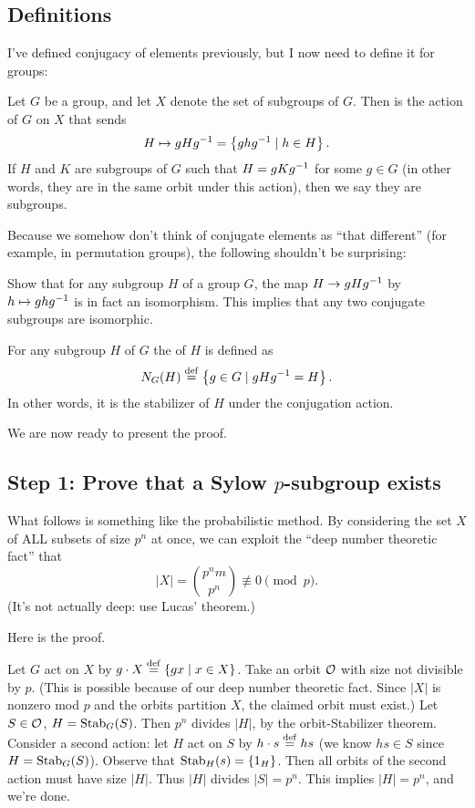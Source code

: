 \subsection*{Definitions}
I've defined conjugacy of elements previously,
but I now need to define it for groups:
\begin{definition}
	Let $G$ be a group, and let $X$ denote the set of subgroups of $G$.
	Then  is the action of $G$ on $X$ that sends
	\[ H \mapsto gHg^{-1} = \left\{ ghg^{-1} \mid h \in H \right\}. \]
	If $H$ and $K$ are subgroups of $G$ such that $H = gKg^{-1}$ for some $g \in G$
	(in other words, they are in the same orbit under this action),
	then we say they are  subgroups.
\end{definition}

Because we somehow don't think of conjugate elements as
``that different'' (for example, in permutation groups),
the following shouldn't be surprising:
\begin{ques}
	Show that for any subgroup $H$ of a group $G$, the map $H \to gHg^{-1}$ by
	$h \mapsto ghg^{-1}$ is in fact an isomorphism.
	This implies that any two conjugate subgroups are isomorphic.
\end{ques}

\begin{definition}
	For any subgroup $H$ of $G$ the  of $H$ is defined as
	\[ N_G(H) \overset{\mathrm{def}}{=} \left\{ g \in G \mid gHg^{-1} = H \right\}. \]
	In other words, it is the stabilizer of $H$ under the conjugation action.
\end{definition}

We are now ready to present the proof.

\subsection*{Step 1: Prove that a Sylow $p$-subgroup exists}
What follows is something like the probabilistic method.
By considering the set $X$ of ALL subsets of size $p^n$ at once, we can exploit the ``deep number theoretic fact'' that 
\[ \left\lvert X \right\rvert = \binom{p^n m}{p^n} \not\equiv 0 \pmod p. \]
(It's not actually deep: use Lucas' theorem.)

Here is the proof.
\begin{itemize}
	\ii Let $G$ act on $X$ by $g \cdot X \overset{\mathrm{def}}{=} \left\{ gx \mid x \in X \right\}$.
	\ii Take an orbit $\mathcal O$ with size not divisible by $p$.
	(This is possible because of our deep number theoretic fact.
	Since $\left\lvert X \right\rvert$ is nonzero mod $p$ and the orbits partition $X$,
	the claimed orbit must exist.)
	\ii Let $S \in \mathcal O$, $H = \operatorname{Stab}_G(S)$.
	Then $p^n$ divides $\left\lvert H \right\rvert$, by the orbit-Stabilizer theorem.
	\ii Consider a second action: let $H$ act on $S$ by 
	$h \cdot s \overset{\mathrm{def}}{=} hs$ (we know $hs \in S$ since $H = \operatorname{Stab}_G(S)$).
	\ii
	Observe that $\operatorname{Stab}_H(s) = \{1_H\}$.
	Then all orbits of the second action must have size $\left\lvert H \right\rvert$. Thus $\left\lvert H \right\rvert$ divides $\left\lvert S \right\rvert = p^n$.
	\ii This implies $\left\lvert H \right\rvert = p^n$, and we're done.
\end{itemize}


